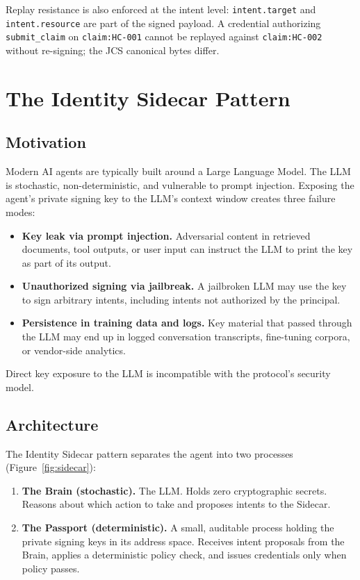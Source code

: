 \documentclass[11pt,a4paper]{article}
\begin{document}
Replay resistance is also enforced at the intent level: \verb|intent.target| and \verb|intent.resource| are part of the signed payload. A credential authorizing \verb|submit_claim| on \verb|claim:HC-001| cannot be replayed against \verb|claim:HC-002| without re-signing; the JCS canonical bytes differ.

\section{The Identity Sidecar Pattern}
\label{sec:sidecar}

\subsection{Motivation}

Modern AI agents are typically built around a Large Language Model. The LLM is stochastic, non-deterministic, and vulnerable to prompt injection. Exposing the agent's private signing key to the LLM's context window creates three failure modes:

\begin{itemize}[leftmargin=*]
\item \textbf{Key leak via prompt injection.} Adversarial content in retrieved documents, tool outputs, or user input can instruct the LLM to print the key as part of its output.
\item \textbf{Unauthorized signing via jailbreak.} A jailbroken LLM may use the key to sign arbitrary intents, including intents not authorized by the principal.
\item \textbf{Persistence in training data and logs.} Key material that passed through the LLM may end up in logged conversation transcripts, fine-tuning corpora, or vendor-side analytics.
\end{itemize}

Direct key exposure to the LLM is incompatible with the protocol's security model.

\subsection{Architecture}

The Identity Sidecar pattern separates the agent into two processes (Figure~\ref{fig:sidecar}):

\begin{enumerate}[label=\arabic*.,leftmargin=*]
\item \textbf{The Brain (stochastic).} The LLM. Holds zero cryptographic secrets. Reasons about which action to take and proposes intents to the Sidecar.
\item \textbf{The Passport (deterministic).} A small, auditable process holding the private signing keys in its address space. Receives intent proposals from the Brain, applies a deterministic policy check, and issues credentials only when policy passes.
\end{enumerate}
\end{document}

